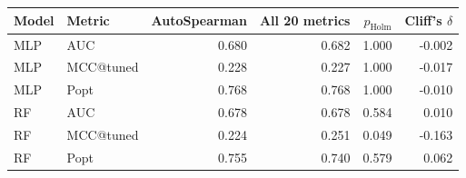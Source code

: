 \small
\begin{tabular}{llrrrr}
\toprule
Model & Metric & AutoSpearman & All 20 metrics & $p_{\mathrm{Holm}}$ & Cliff's $\delta$ \\
\midrule
MLP & AUC & 0.680 & 0.682 & 1.000 & -0.002 \\
MLP & MCC@tuned & 0.228 & 0.227 & 1.000 & -0.017 \\
MLP & Popt & 0.768 & 0.768 & 1.000 & -0.010 \\
RF & AUC & 0.678 & 0.678 & 0.584 & 0.010 \\
RF & MCC@tuned & 0.224 & 0.251 & 0.049 & -0.163 \\
RF & Popt & 0.755 & 0.740 & 0.579 & 0.062 \\
\bottomrule
\end{tabular}
